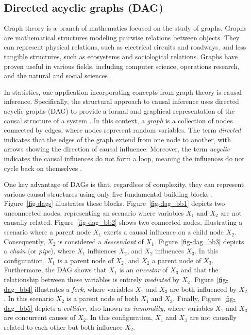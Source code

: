 \documentclass[
  authoryear,
  preprint,
  1p]{elsarticle}
\begin{document}
\subsection{Directed acyclic graphs (DAG)}\label{sec-framework-dag}

Graph theory is a branch of mathematics focused on the study of graphs.
Graphs are mathematical structures modeling pairwise relations between
objects. They can represent physical relations, such as electrical
circuits and roadways, and less tangible structures, such as ecosystems
and sociological relations. Graphs have proven useful in various fields,
including computer science, operations research, and the natural and
social sciences \citep{Gross_et_al_2018}.

In statistics, one application incorporating concepts from graph theory
is causal inference. Specifically, the structural approach to causal
inference uses directed acyclic graphs (DAG) to provide a formal and
graphical representation of the causal structure of a system
\citep{Neal_2020}. In this context, a \emph{graph} is a collection of
nodes connected by edges, where nodes represent random variables. The
term \emph{directed} indicates that the edges of the graph extend from
one node to another, with arrows showing the direction of causal
influence. Moreover, the term \emph{acyclic} indicates the causal
influences do not form a loop, meaning the influences do not cycle back
on themselves \citep{McElreath_2020}.

One key advantage of DAGs is that, regardless of complexity, they can
represent various causal structures using only five fundamental building
blocks \citep{Neal_2020, McElreath_2020}. Figure~\ref{fig-dags}
illustrates these blocks. Figure~\ref{fig-dag_bb1} depicts two
unconnected nodes, representing an scenario where variables \(X_{1}\)
and \(X_{2}\) are not causally related. Figure~\ref{fig-dag_bb2} shows
two connected nodes, illustrating a scenario where a parent node
\(X_{1}\) exerts a causal influence on a child node \(X_{2}\).
Consequently, \(X_{2}\) is considered a \emph{descendant} of \(X_{1}\).
Figure~\ref{fig-dag_bb3} depicts a \emph{chain} (or \emph{pipe}), where
\(X_{1}\) influences \(X_{2}\), and \(X_{2}\) influences \(X_{3}\). In
this configuration, \(X_{1}\) is a parent node of \(X_{2}\), and
\(X_{2}\) a parent node of \(X_{3}\). Furthermore, the DAG shows that
\(X_{1}\) is an \emph{ancestor} of \(X_{3}\) and that the relationship
between these variables is entirely \emph{mediated} by \(X_{2}\).
Figure~\ref{fig-dag_bb4} illustrates a \emph{fork}, where variables
\(X_{1}\) and \(X_{3}\) are both influenced by \(X_{2}\). In this
scenario \(X_{2}\) is a parent node of both \(X_{1}\) and \(X_{3}\).
Finally, Figure~\ref{fig-dag_bb5} depicts a \emph{collider}, also known
as \emph{inmorality}, where variables \(X_{1}\) and \(X_{3}\) are
concurrent causes of \(X_{2}\). In this configuration, \(X_{1}\) and
\(X_{3}\) are not causally related to each other but both influence
\(X_{2}\).
\end{document}
